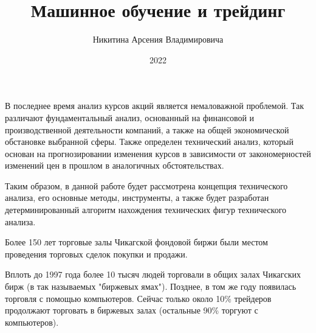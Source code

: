 \documentclass[bachelor, och, coursework]{SCWorks}
\begin{document}

\title{Машинное обучение и трейдинг}






\author{Никитина Арсения Владимировича}

\chtitle{} %


\date{2022}

\maketitle



\tableofcontents

\intro
    В последнее время анализ курсов акций является немаловажной проблемой. Так
    различают фундаментальный анализ, основанный на финансовой и производственной
    деятельности компаний, а также на общей экономической обстановке выбранной 
    сферы. Также определен технический анализ, который основан на прогнозировании 
    изменения курсов в зависимости от закономерностей изменений цен в прошлом в 
    аналогичных обстоятельствах.

    Таким образом, в данной работе будет рассмотрена концепция технического
    анализа, его основные методы, инструменты, а также будет разработан
    детерминированный алгоритм нахождения технических фигур технического анализа.
    
    Более 150 лет торговые залы Чикагской фондовой биржи были местом проведения 
    торговых сделок покупки и продажи.

    Вплоть до 1997 года более 10 тысяч людей торговали в общих залах 
    Чикагских бирж (в так называемых "биржевых ямах"). Позднее, в том же году 
    появилась торговля с помощью компьютеров. Сейчас только около 10\% трейдеров 
    продолжают торговать в биржевых залах (остальные 90\% торгуют с компьютеров).
\end{document}
